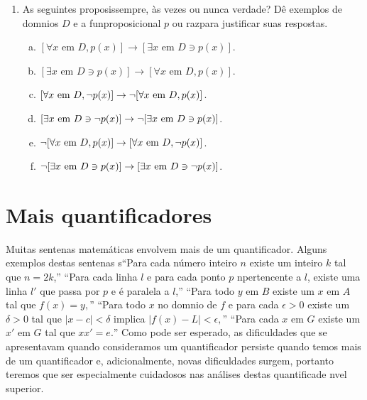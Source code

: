 \begin{enumerate}[{\bf 1.}]
\item As seguintes proposi\coes s\ao sempre, \`as vezes ou nunca verdade? D\^e exemplos de dom\ih nios $D$ e a fun\cao proposicional $p$ ou raz\oes para justificar suas respostas. 
\begin{enumerate}[a)]
\item $[\forall x \textrm{ em } D, p(x)]\to[\exists x \textrm{ em } D \ni p(x)]$.
\item $[\exists x \textrm{ em } D \ni p(x)]\to[\forall x \textrm{ em } D, p(x)]$.
\item $[\forall x \textrm{ em } D, \lnot p(x)]\to\lnot[\forall x \textrm{ em } D, p(x)]$.
\item $[\exists x \textrm{ em } D \ni \lnot p(x)]\to \lnot[\exists x \textrm{ em } D \ni p(x)]$.
\item $\lnot[\forall x \textrm{ em } D, p(x)]\to[\forall x \textrm{ em } D, \lnot p(x)]$.
\item $\lnot[\exists x \textrm{ em } D \ni p(x)]\to[\exists x \textrm{ em } D \ni \lnot p(x)]$.
\end{enumerate}
\end{enumerate}

\section{Mais quantificadores}\label{mquantificadores}

Muitas senten\cc as matem\'aticas envolvem mais de um quantificador. Alguns exemplos destas senten\cc as s\ao ``Para cada n\'umero inteiro $n$ existe um inteiro $k$ tal que $n=2k$,'' ``Para cada linha $l$ e para cada ponto $p$ n\ao pertencente a $l$, existe uma linha $l'$ que passa por $p$ e \'e paralela a $l$,'' ``Para todo $y$ em $B$ existe um $x$ em $A$ tal que $f(x)=y,$'' ``Para todo $x$ no dom\ih nio de $f$  e para cada $\epsilon >0$ existe um $\delta >0$ tal que $|x-c|<\delta$ implica $|f(x)-L|<\epsilon,$'' ``Para cada $x$ em $G$ existe um $x'$ em $G$ tal que $xx'=e.$'' Como pode ser esperado, as dificuldades que se apresentavam quando consideramos um quantificador persiste quando temos mais de um quantificador e, adicionalmente, novas dificuldades surgem, portanto teremos que ser especialmente cuidadosos nas an\'alises destas quantifica\coes de n\ih vel superior.

